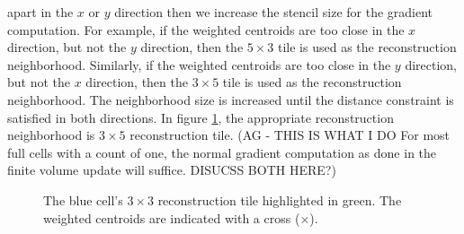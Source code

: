 \begin{enumerate}
apart in the $x$ or $y$ direction then we increase the stencil size for the 
gradient computation.  For example, if the weighted centroids are too close in the $x$ 
direction, but not the $y$ direction, then the $5\times 3$ tile is used as the 
reconstruction neighborhood.  Similarly, if the weighted centroids are too 
close in the $y$ direction, but not the $x$ direction, then the $3\times 5$ tile is 
used as the reconstruction neighborhood.  The neighborhood size is increased until the 
distance constraint is satisfied in both directions.  In figure \ref{fig:tooclose},
the appropriate reconstruction neighborhood is $3\times 5$ reconstruction tile.
(AG - THIS IS WHAT I DO For most full cells with a count of one,
the normal gradient computation as done in the finite volume update will suffice.
DISUCSS BOTH HERE?)
\begin{figure}
    \centering
     \hfill
    \caption{\sf The blue cell's $3\times3$ reconstruction tile highlighted in green.  The weighted centroids are indicated with a cross ($\times$).}
    \label{fig:tooclose}
\end{figure}


\end{enumerate}
